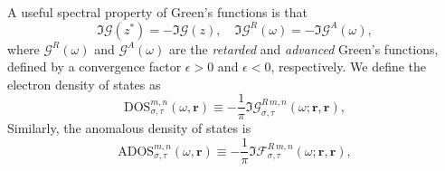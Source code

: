 A useful spectral property of Green's functions is that
\begin{equation}
\Im\bm{\mathcal{G}}(z^*)=-\Im\bm{\mathcal{G}}(z), \quad
\Im\bm{\mathcal{G}}^R(\omega)=-\Im\bm{\mathcal{G}}^A(\omega),
\end{equation}
where $\bm{\mathcal{G}}^R(\omega)$ and $\bm{\mathcal{G}}^A(\omega)$ are the \textit{retarded} and \textit{advanced} Green's functions, defined by a convergence factor $\epsilon>0$ and $\epsilon<0$, respectively. 
We define the electron density of states as
\begin{equation}
\text{DOS}_{\sigma,\tau}^{m,n}\left(\omega,\mathbf{r}\right)
\equiv
 -\frac{1}{\pi}
 \Im{\mathcal{G}}_{\sigma,\tau}^{R\,m,n}\left(\omega; \mathbf{r}, \mathbf{r}\right),
\end{equation}
Similarly, the anomalous density of states is
\begin{equation}
\text{ADOS}_{\sigma,\tau}^{m,n}\left(\omega,\mathbf{r}\right)
\equiv
 -\frac{1}{\pi}\Im{\mathcal{F}}_{\sigma,\tau}^{R\,m,n}\left(\omega; \mathbf{r}, \mathbf{r}\right),
\end{equation}


